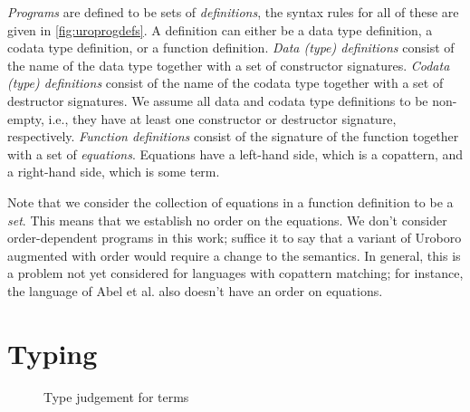 \textit{Programs} are defined to be sets of \textit{definitions}, the syntax rules for all of these are given in \autoref{fig:uroprogdefs}. A definition can either be a data type definition, a codata type definition, or a function definition. \textit{Data (type) definitions} consist of the name of the data type together with a set of constructor signatures. \textit{Codata (type) definitions} consist of the name of the codata type together with a set of destructor signatures. We assume all data and codata type definitions to be non-empty, i.e., they have at least one constructor or destructor signature, respectively. \textit{Function definitions} consist of the signature of the function together with a set of \textit{equations}. Equations have a left-hand side, which is a copattern, and a right-hand side, which is some term.

Note that we consider the collection of equations in a function definition to be a \textit{set}. This means that we establish no order on the equations. We don't consider order-dependent programs in this work; suffice it to say that a variant of Uroboro augmented with order would require a change to the semantics. In general, this is a problem not yet considered for languages with copattern matching; for instance, the language of Abel et al.\cite{abel13copatterns} also doesn't have an order on equations.

\section{Typing}
\label{sec:urostatsem}

\begin{figure}
\begin{prooftree}
\end{prooftree}

\begin{prooftree}
\end{prooftree}

\begin{prooftree}
\end{prooftree}

\begin{prooftree}
\end{prooftree}
\caption{Type judgement for terms}
\label{fig:typjterm}
\end{figure}

